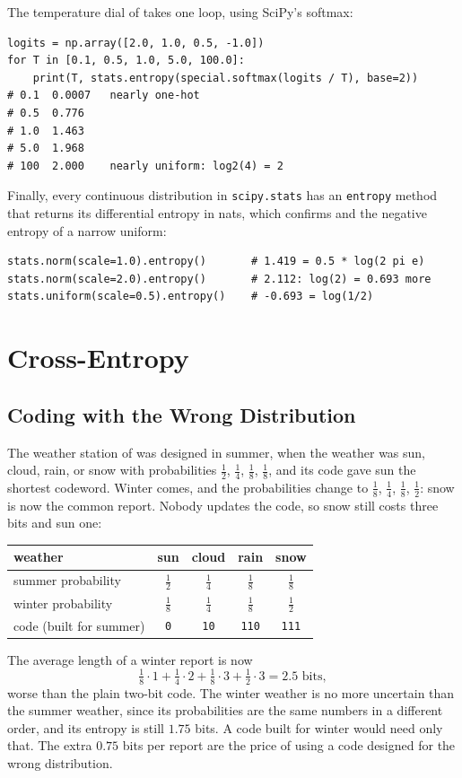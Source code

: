 The temperature dial of  takes one loop, using
SciPy's softmax:

\begin{lstlisting}
logits = np.array([2.0, 1.0, 0.5, -1.0])
for T in [0.1, 0.5, 1.0, 5.0, 100.0]:
    print(T, stats.entropy(special.softmax(logits / T), base=2))
# 0.1  0.0007   nearly one-hot
# 0.5  0.776
# 1.0  1.463
# 5.0  1.968
# 100  2.000    nearly uniform: log2(4) = 2
\end{lstlisting}

Finally, every continuous distribution in \texttt{scipy.stats} has an
\texttt{entropy} method that returns its differential entropy in nats,
which confirms  and the negative entropy
of a narrow uniform:

\begin{lstlisting}
stats.norm(scale=1.0).entropy()       # 1.419 = 0.5 * log(2 pi e)
stats.norm(scale=2.0).entropy()       # 2.112: log(2) = 0.693 more
stats.uniform(scale=0.5).entropy()    # -0.693 = log(1/2)
\end{lstlisting}

\section{Cross-Entropy}
\label{sec:ch07-cross-entropy}

\subsection{Coding with the Wrong Distribution}
\label{sec:ch07-ce-idea}

The weather station of  was designed in summer,
when the weather was sun, cloud, rain, or snow with probabilities
$\tfrac12$, $\tfrac14$, $\tfrac18$, $\tfrac18$, and its code gave sun the
shortest codeword. Winter comes, and the probabilities change to
$\tfrac18$, $\tfrac14$, $\tfrac18$, $\tfrac12$: snow is now the common
report. Nobody updates the code, so snow still costs three bits and sun
one:
\begin{center}
  \begin{tabular}{@{}lcccc@{}}
    \toprule
    weather & sun & cloud & rain & snow \\
    \midrule
    summer probability & $\tfrac12$ & $\tfrac14$ & $\tfrac18$ & $\tfrac18$ \\
    winter probability & $\tfrac18$ & $\tfrac14$ & $\tfrac18$ & $\tfrac12$ \\
    code (built for summer) & \texttt{0} & \texttt{10} & \texttt{110}
      & \texttt{111} \\
    \bottomrule
  \end{tabular}
\end{center}
The average length of a winter report is now
\[
  \tfrac18 \cdot 1 + \tfrac14 \cdot 2 + \tfrac18 \cdot 3 + \tfrac12 \cdot 3
  = 2.5 \text{ bits},
\]
worse than the plain two-bit code. The winter weather is no more
uncertain than the summer weather, since its probabilities are the same
numbers in a different order, and its entropy is still $1.75$ bits. A
code built for winter would need only that. The extra $0.75$ bits per
report are the price of using a code designed for the wrong
distribution.

